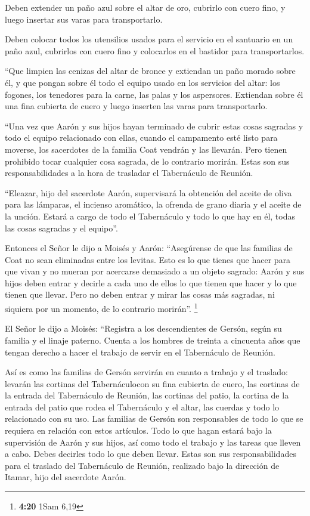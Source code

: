  Deben extender un paño azul sobre el altar de oro,
cubrirlo con cuero fino, y luego insertar sus varas para transportarlo.

 Deben colocar todos los utensilios usados para el
servicio en el santuario en un paño azul, cubrirlos con cuero fino y
colocarlos en el bastidor para transportarlos.

 ``Que limpien las cenizas del altar de bronce y
extiendan un paño morado sobre él,  y que pongan sobre él
todo el equipo usado en los servicios del altar: los fogones, los
tenedores para la carne, las palas y los aspersores. Extiendan sobre él
una fina cubierta de cuero y luego inserten las varas para
transportarlo.

 ``Una vez que Aarón y sus hijos hayan terminado de
cubrir estas cosas sagradas y todo el equipo relacionado con ellas,
cuando el campamento esté listo para moverse, los sacerdotes de la
familia Coat vendrán y las llevarán. Pero tienen prohibido tocar
cualquier cosa sagrada, de lo contrario morirán. Estas son sus
responsabilidades a la hora de trasladar el Tabernáculo de Reunión.

 ``Eleazar, hijo del sacerdote Aarón, supervisará la
obtención del aceite de oliva para las lámparas, el incienso aromático,
la ofrenda de grano diaria y el aceite de la unción. Estará a cargo de
todo el Tabernáculo y todo lo que hay en él, todas las cosas sagradas y
el equipo''.

 Entonces el Señor le dijo a Moisés y Aarón:
 ``Asegúrense de que las familias de Coat no sean
eliminadas entre los levitas.  Esto es lo que tienes que
hacer para que vivan y no mueran por acercarse demasiado a un objeto
sagrado: Aarón y sus hijos deben entrar y decirle a cada uno de ellos lo
que tienen que hacer y lo que tienen que llevar.  Pero no
deben entrar y mirar las cosas más sagradas, ni siquiera por un momento,
de lo contrario morirán''. \footnote{\textbf{4:20} 1Sam 6,19}

 El Señor le dijo a Moisés:  ``Registra a
los descendientes de Gersón, según su familia y el linaje paterno.
 Cuenta a los hombres de treinta a cincuenta años que
tengan derecho a hacer el trabajo de servir en el Tabernáculo de
Reunión.

 Así es como las familias de Gersón servirán en cuanto a
trabajo y el traslado:  levarán las cortinas del
Tabernáculocon su fina cubierta de cuero, las cortinas de la entrada del
Tabernáculo de Reunión,  las cortinas del patio, la
cortina de la entrada del patio que rodea el Tabernáculo y el altar, las
cuerdas y todo lo relacionado con su uso. Las familias de Gersón son
responsables de todo lo que se requiera en relación con estos artículos.
 Todo lo que hagan estará bajo la supervisión de Aarón y
sus hijos, así como todo el trabajo y las tareas que lleven a cabo.
Debes decirles todo lo que deben llevar.  Estas son sus
responsabilidades para el traslado del Tabernáculo de Reunión, realizado
bajo la dirección de Itamar, hijo del sacerdote Aarón.

